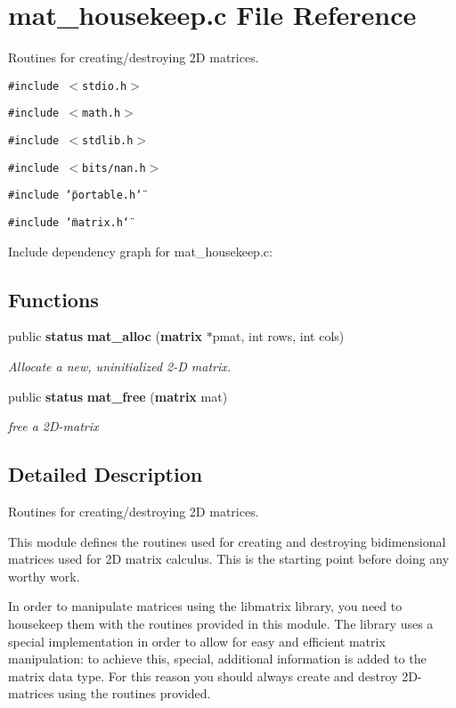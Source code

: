 \section{mat\_\-housekeep.c File Reference}
\label{mat__housekeep_8c}
Routines for creating/destroying 2D matrices. 


{\tt \#include $<$stdio.h$>$}\par
{\tt \#include $<$math.h$>$}\par
{\tt \#include $<$stdlib.h$>$}\par
{\tt \#include $<$bits/nan.h$>$}\par
{\tt \#include \char`\"{}portable.h\char`\"{}}\par
{\tt \#include \char`\"{}matrix.h\char`\"{}}\par


Include dependency graph for mat\_\-housekeep.c:\subsection*{Functions}
\begin{CompactItemize}
\item 
public {\bf status} {\bf mat\_\-alloc} ({\bf matrix} $\ast$pmat, int rows, int cols)
\begin{CompactList}\small\item\em Allocate a new, uninitialized 2-D matrix.\item\end{CompactList}\item 
public {\bf status} {\bf mat\_\-free} ({\bf matrix} mat)
\begin{CompactList}\small\item\em free a 2D-matrix\item\end{CompactList}\end{CompactItemize}


\subsection{Detailed Description}
Routines for creating/destroying 2D matrices.



This module defines the routines used for creating and destroying bidimensional matrices used for 2D matrix calculus. This is the  starting point before doing any worthy work.

In order to manipulate matrices using the libmatrix library, you need to housekeep them with the routines provided in this module. The library uses a special implementation in order to allow for easy and efficient matrix manipulation: to achieve this, special, additional information is added to the matrix data type. For this reason you should always create and destroy 2D-matrices using the routines provided.

